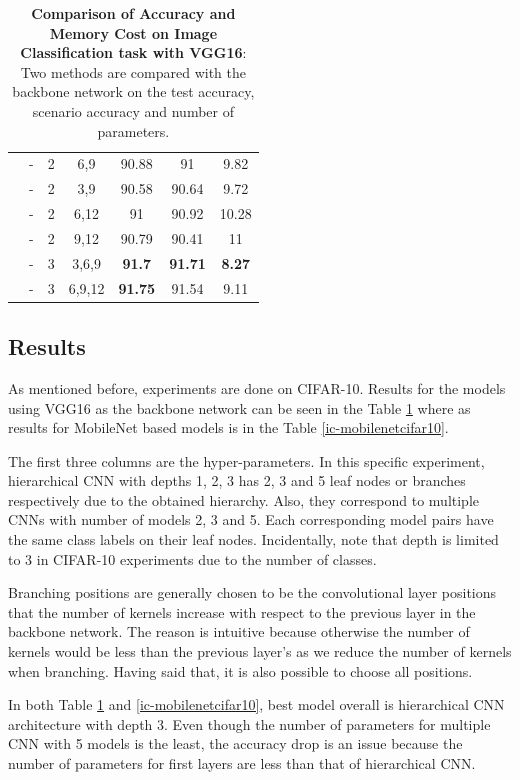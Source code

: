 \begin{table}
\begin{center}
\begin{tabular}{c||c|c|c||c|c|c}
\cline{2-7} 
& - & 2 & 6,9 & 90.88 & 91 & 9.82 \\ 
\cline{2-7} 
& - & 2 & 3,9 & 90.58 & 90.64 & 9.72 \\ 
\cline{2-7} 
& - & 2 & 6,12 & 91 & 90.92 & 10.28 \\ 
\cline{2-7} 
& - & 2 & 9,12 & 90.79 & 90.41 & 11 \\ 
\cline{2-7} 
& - & 3 & 3,6,9 & \textbf{91.7} & \textbf{91.71} & \textbf{8.27} \\ 
\cline{2-7} 
& - & 3 & 6,9,12 & \textbf{91.75} & 91.54 & 9.11                                                                   
\end{tabular}
\end{center}
\caption[Comparison of Accuracy and Memory Cost on Image Classification task with VGG16]{\textbf{Comparison of Accuracy and Memory Cost on Image Classification task with VGG16}: Two methods are compared with the backbone network on the test accuracy, scenario accuracy and number of parameters.}
\label{ic-vgg16cifar10}
\end{table}


\subsection{Results}
As mentioned before, experiments are done on CIFAR-10. Results for the models using VGG16 as the backbone network can be seen in the Table \ref{ic-vgg16cifar10} where as results for MobileNet based models is in the Table \ref{ic-mobilenetcifar10}. 

The first three columns are the hyper-parameters. 
In this specific experiment, hierarchical CNN with depths 1, 2, 3 has 2, 3 and 5 leaf nodes or branches respectively due to the obtained hierarchy.
Also, they correspond to multiple CNNs with number of models 2, 3 and 5. 
Each corresponding model pairs have the same class labels on their leaf nodes.
Incidentally, note that depth is limited to 3 in CIFAR-10 experiments due to the number of classes.

Branching positions are generally chosen to be the convolutional layer positions that the number of kernels increase with respect to the previous layer in the backbone network. 
The reason is intuitive because otherwise the number of kernels would be less than the previous layer's as we reduce the number of kernels when branching. 
Having said that, it is also possible to choose all positions.

In both Table \ref{ic-vgg16cifar10} and \ref{ic-mobilenetcifar10}, best model overall is hierarchical CNN architecture with depth 3. 
Even though the number of parameters for multiple CNN with 5 models is the least, the accuracy drop is an issue because the number of parameters for first layers are less than that of hierarchical CNN.


